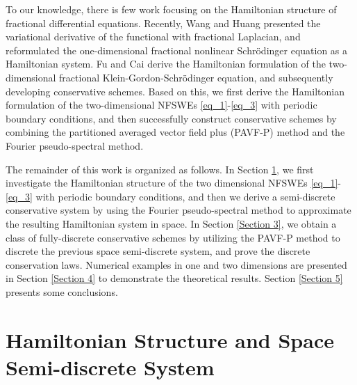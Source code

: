 \documentclass[preprint,compress,3p,10pt,fleqn]{elsarticle}
\numberwithin{equation}{section}
\begin{document}
To our knowledge,  there is few work focusing on the Hamiltonian structure of fractional differential equations. Recently, Wang and Huang \cite{wangStructurepreservingNumericalMethods2018} presented the variational derivative of the functional with fractional Laplacian, and reformulated the one-dimensional fractional nonlinear Schr{\"o}dinger equation as a Hamiltonian system.
Fu and Cai  \cite{fuStructurepreservingAlgorithmsTwodimensional2020} derive the Hamiltonian formulation of the two-dimensional fractional Klein-Gordon-Schr{\"o}dinger equation, and subsequently developing conservative schemes.
Based on this, we first derive the Hamiltonian formulation of the two-dimensional NFSWEs \eqref{eq_1}-\eqref{eq_3} with periodic boundary conditions, and then successfully construct conservative schemes by combining the partitioned averaged vector field plus (PAVF-P) method and the Fourier pseudo-spectral method.

The remainder of this work is organized as follows.
In Section \ref{Section 2}, we first investigate the Hamiltonian structure of the two dimensional NFSWEs \eqref{eq_1}-\eqref{eq_3} with periodic boundary conditions, and then we derive a semi-discrete conservative system by using the Fourier pseudo-spectral method to approximate the resulting Hamiltonian system in space.
In Section \ref{Section 3}, we obtain a class of fully-discrete conservative schemes by utilizing the PAVF-P method to discrete the previous space semi-discrete system, and prove the discrete conservation laws. Numerical examples in one and two dimensions are presented in Section \ref{Section 4} to demonstrate the theoretical results. Section \ref{Section 5} presents some conclusions.


\section{Hamiltonian Structure and Space Semi-discrete System}\label{Section 2}
\end{document}

